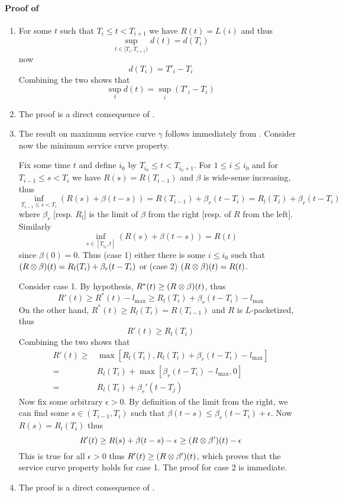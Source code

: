 \paragraph{Proof of }
\begin{enumerate}
\item
For some $t$ such that $T_i \leq t < T_{i+1}$ we have $R(t)=L(i)$
and thus
$$\sup_{t \in [T_i, T_{i+1})} d(t) =d(T_i)$$
now $$d(T_i)=T'_i -T_i$$ Combining the two shows that
$$\sup_t d(t) =\sup_i (T'_i -T_i)$$

\item The
proof is a direct consequence of .

\item The result on maximum service curve $\gamma$ follows immediately
from . Consider now the minimum service curve
property.

Fix some time $t$ and define $i_0$ by $T_{i_0} \leq t <T_{i_0
+1}$. For $1\leq i\leq i_0$ and for $T_{i-1} \leq s < T_{i}$
we have $R(s)=R(T_{i-1})$ and $\beta$ is wide-sense
increasing, thus
 $$
 \inf_{T_{i-1} \leq s < T_{i}}\left( R(s) + \beta(t-s) \right)
 =
 R(T_{i-1}) + \beta_r(t-T_{i})=R_l(T_{i})+ \beta_r(t-T_{i})
 $$
 where $\beta_r$ [resp. $R_l$] is the
 limit of $\beta$ from the right [resp. of $R$ from the left]. Similarly
 $$\inf_{s \in [T_{i_0},t]} \left( R(s) + \beta(t-s)
 \right)=R(t)
 $$
 since $\beta(0)=0$. Thus (case 1) either there is some $i
  \leq i_0$ such that $(R \otimes \beta )(t)=R_l(T_i)+
 \beta_r(t-T_i)$ or (case 2) $(R \otimes \beta )(t)=R(t)$.

 Consider case 1. By hypothesis, $R^*(t) \geq (R\otimes \beta) (t)$, thus
 $$R'(t) \geq R^*(t) - l_{\max}
 \geq  R_l(T_i) + \beta_r(t-T_i) -l_{\max}
 $$
On the other hand, $R^*(t) \geq R_l(T_i)=R(T_{i-1})$ and $R$
is $L$-packetized, thus
$$R'(t) \geq R_l(T_i)$$
Combining the two shows that
$$\begin{array}{rl}
   R'(t) \geq & \max\left[ R_l(T_i), R_l(T_i) + \beta_r(t-T_i) -l_{\max}
         \right] \\
     = & R_l(T_i) + \max\left[\beta_r(t-T_i) -l_{\max},0 \right]\\
     = & R_l(T_i) + \beta_r'(t-T_j)
  \end{array}
 $$
 Now fix some arbitrary $\epsilon >0$. By definition of the limit from the right,
we can find some $s \in (T_{i-1}, T_i)$ such that $\beta(t-s)
\leq \beta_r(t-T_i) +\epsilon$. Now $R(s)=R_l(T_i)$ thus
$$
 R'(t) \geq R(s) + \beta(t-s) - \epsilon \geq (R
 \otimes \beta')(t) -\epsilon
 $$
This is true for all $\epsilon >0$ thus $R'(t) \geq (R
 \otimes \beta')(t)$, which proves that the service curve
 property holds for case 1. The proof for case 2 is immediate.
\item The
proof is a direct consequence of .
\end{enumerate}

